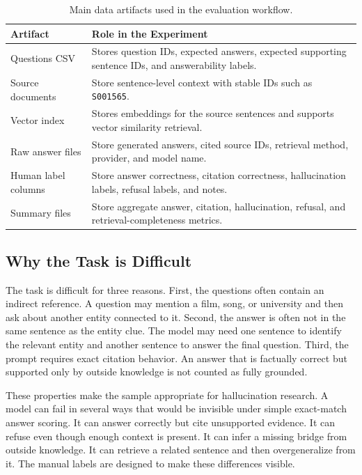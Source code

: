 \documentclass[10pt,twocolumn]{article}
\begin{document}
\begin{table}[t]
\centering
\small
\begin{tabular}{p{}p{}}
\toprule
\textbf{Artifact} & \textbf{Role in the Experiment} \\
\midrule
Questions CSV & Stores question IDs, expected answers, expected supporting sentence IDs, and answerability labels. \\
Source documents & Store sentence-level context with stable IDs such as \texttt{S001565}. \\
Vector index & Stores embeddings for the source sentences and supports vector similarity retrieval. \\
Raw answer files & Store generated answers, cited source IDs, retrieval method, provider, and model name. \\
Human label columns & Store answer correctness, citation correctness, hallucination labels, refusal labels, and notes. \\
Summary files & Store aggregate answer, citation, hallucination, refusal, and retrieval-completeness metrics. \\
\bottomrule
\end{tabular}
\caption{Main data artifacts used in the evaluation workflow.}
\label{tab:artifacts}
\end{table}

\subsection{Why the Task is Difficult}

The task is difficult for three reasons. First, the questions often contain an indirect reference. A question may mention a film, song, or university and then ask about another entity connected to it. Second, the answer is often not in the same sentence as the entity clue. The model may need one sentence to identify the relevant entity and another sentence to answer the final question. Third, the prompt requires exact citation behavior. An answer that is factually correct but supported only by outside knowledge is not counted as fully grounded.

These properties make the sample appropriate for hallucination research. A model can fail in several ways that would be invisible under simple exact-match answer scoring. It can answer correctly but cite unsupported evidence. It can refuse even though enough context is present. It can infer a missing bridge from outside knowledge. It can retrieve a related sentence and then overgeneralize from it. The manual labels are designed to make these differences visible.
\end{document}
